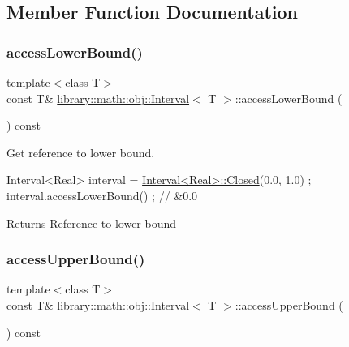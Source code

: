 \subsection{Member Function Documentation}
\mbox{\label{classlibrary_1_1math_1_1obj_1_1_interval_ada0dc68134cfacd5a0e959b492cea534}} 
\subsubsection{\texorpdfstring{access\+Lower\+Bound()}{accessLowerBound()}}
{\footnotesize\ttfamily template$<$class T$>$ \\
const T\& \hyperlink{classlibrary_1_1math_1_1obj_1_1_interval}{library\+::math\+::obj\+::\+Interval}$<$ T $>$\+::access\+Lower\+Bound (\begin{DoxyParamCaption}{ }\end{DoxyParamCaption}) const}



Get reference to lower bound. 


\begin{DoxyCode}
Interval<Real> interval = \hyperlink{classlibrary_1_1math_1_1obj_1_1_interval_aae8bb2b89af450729338d48563def4d7}{Interval<Real>::Closed}(0.0, 1.0) ;
interval.accessLowerBound() ; \textcolor{comment}{// &0.0}
\end{DoxyCode}


\begin{DoxyReturn}{Returns}
Reference to lower bound 
\end{DoxyReturn}
\mbox{\label{classlibrary_1_1math_1_1obj_1_1_interval_a99692ee706ae6de7cd274ceae3644138}} 
\subsubsection{\texorpdfstring{access\+Upper\+Bound()}{accessUpperBound()}}
{\footnotesize\ttfamily template$<$class T$>$ \\
const T\& \hyperlink{classlibrary_1_1math_1_1obj_1_1_interval}{library\+::math\+::obj\+::\+Interval}$<$ T $>$\+::access\+Upper\+Bound (\begin{DoxyParamCaption}{ }\end{DoxyParamCaption}) const}



